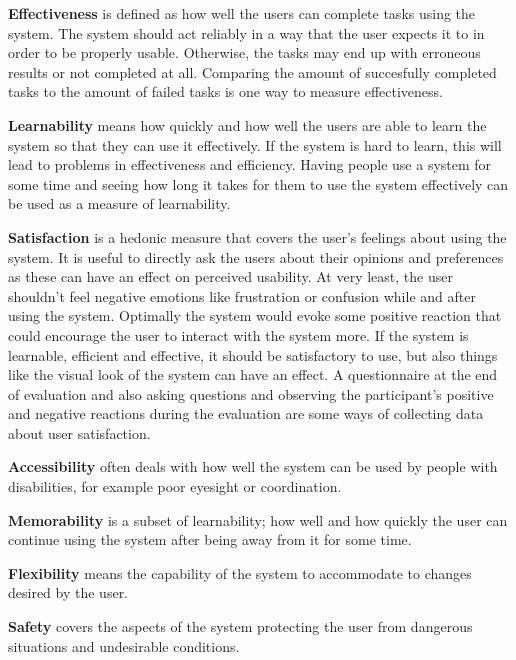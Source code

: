 \textbf{Effectiveness} is defined as how well the users can complete tasks using the system. The system should act reliably in a way that the user expects it to in order to be properly usable. Otherwise, the tasks may end up with erroneous results or not completed at all. Comparing the amount of succesfully completed tasks to the amount of failed tasks is one way to measure effectiveness. \cite{albert2013measuring, rubin2008handbook}

\textbf{Learnability} means how quickly and how well the users are able to learn the system so that they can use it effectively. If the system is hard to learn, this will lead to problems in effectiveness and efficiency. Having people use a system for some time and seeing how long it takes for them to use the system effectively can be used as a measure of learnability. \cite{albert2013measuring, rubin2008handbook}

\textbf{Satisfaction} is a hedonic measure that covers the user's feelings about using the system. It is useful to directly ask the users about their opinions and preferences as these can have an effect on perceived usability. At very least, the user shouldn't feel negative emotions like frustration or confusion while and after using the system. Optimally the system would evoke some positive reaction that could encourage the user to interact with the system more. If the system is learnable, efficient and effective, it should be satisfactory to use, but also things like the visual look of the system can have an effect. A questionnaire at the end of evaluation and also asking questions and observing the participant's positive and negative reactions during the evaluation are some ways of collecting data about user satisfaction. \cite{abran2003usability, winter2008comprehensive}

\textbf{Accessibility} often deals with how well the system can be used by people with disabilities, for example poor eyesight or coordination.  \cite{bevanevaluation}

\textbf{Memorability} is  a subset of learnability; how well and how quickly the user can continue using the system after being away from it for some time. \cite{bevanevaluation}

\textbf{Flexibility} means the capability of the system to accommodate to changes desired by the user. \cite{bevanevaluation}

\textbf{Safety} covers the aspects of the system protecting the user from dangerous situations and undesirable conditions. \cite{bevanevaluation, winter2008comprehensive}

